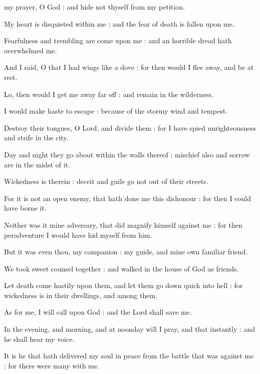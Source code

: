  my prayer, O God : and hide not thyself from my petition.\par
{}
My heart is disquieted within me : and the fear of death is fallen upon me.\par
{}Fearfulness and trembling are come upon me : and an horrible dread hath overwhelmed me.\par
{}And I said, O that I had wings like a dove : for then would I flee away, and be at rest.\par
{}Lo, then would I get me away far off : and remain in the wilderness.\par
{}I would make haste to escape : because of the stormy wind and tempest.\par
{}Destroy their tongues, O Lord, and divide them : for I have spied unrighteousness and strife in the city.\par
{}Day and night they go about within the walls thereof : mischief also and sorrow are in the midst of it.\par
{}Wickedness is therein : deceit and guile go not out of their streets.\par
{}For it is not an open enemy, that hath done me this dishonour : for then I could have borne it.\par
{}Neither was it mine adversary, that did magnify himself against me : for then peradventure I would have hid myself from him.\par
{}But it was even thou, my companion : my guide, and mine own familiar friend.\par
{}We took sweet counsel together : and walked in the house of God as friends.\par
{}Let death come hastily upon them, and let them go down quick into hell : for wickedness is in their dwellings, and among them.\par
{}As for me, I will call upon God : and the Lord shall save me.\par
{}In the evening, and morning, and at noonday will I pray, and that instantly : and he shall hear my voice.\par
{}It is he that hath delivered my soul in peace from the battle that was against me : for there were many with me.\par
